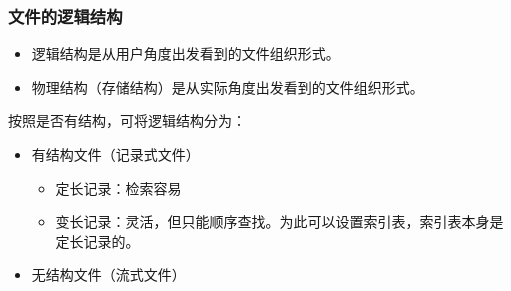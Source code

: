 \documentclass[12pt, a4paper, oneside]{ctexart}
\begin{document}
\subsubsection{文件的逻辑结构}

\begin{itemize}
  \item 逻辑结构是从用户角度出发看到的文件组织形式。
  \item 物理结构（存储结构）是从实际角度出发看到的文件组织形式。
\end{itemize}

按照是否有结构，可将逻辑结构分为：
\begin{itemize}
  \item 有结构文件（记录式文件）
  \begin{itemize}
    \item 定长记录：检索容易
    \item 变长记录：灵活，但只能顺序查找。为此可以设置索引表，索引表本身是定长记录的。
  \end{itemize}
  \item 无结构文件（流式文件）
\end{itemize}
\end{document}
